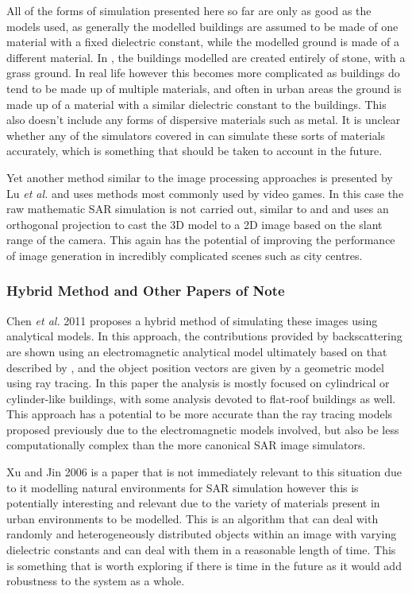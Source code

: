 All of the forms of simulation presented here so far are only as good as the models used, as generally the modelled buildings are assumed to be made of one material with a fixed dielectric constant, while the modelled ground is made of a different material. In \cite{hammerComparisonSARSimulation2008}, the buildings modelled are created entirely of stone, with a grass ground. In real life however this becomes more complicated as buildings do tend to be made up of multiple materials, and often in urban areas the ground is made up of a material with a similar dielectric constant to the buildings. This also doesn't include any forms of dispersive materials such as metal. It is unclear whether any of the simulators covered in \cite{hammerComparisonSARSimulation2008} can simulate these sorts of materials accurately, which is something that should be taken to account in the future. \par
Yet another method similar to the image processing approaches is presented by Lu \textit{et al.} \cite{luGPUBasedRealtime2009} and uses methods most commonly used by video games. In this case the raw mathematic SAR simulation is not carried out, similar to \cite{balzHybridGPUBasedSingle2009} and \cite{auerRayTracingSimulating2008} and uses an orthogonal projection to cast the 3D model to a 2D image based on the slant range of the camera. This again has the potential of improving the performance of image generation in incredibly complicated scenes such as city centres.
\par 
\subsubsection{Hybrid Method and Other Papers of Note}
Chen \textit{et al.} 2011 \cite{chenRadarImagingSimulation2011} proposes a hybrid method of simulating these images using analytical models. In this approach, the contributions provided by backscattering are shown using an electromagnetic analytical model ultimately based on that described by \cite{franceschettiSARRawSignal2003}, and the object position vectors are given by a geometric model using ray tracing. In this paper the analysis is mostly focused on cylindrical or cylinder-like buildings, with some analysis devoted to flat-roof buildings as well. This approach has a potential to be more accurate than the ray tracing models proposed previously due to the electromagnetic models involved, but also be less computationally complex than the more canonical SAR image simulators. 
\par
Xu and Jin 2006 \cite{xuImagingSimulationPolarimetric2006} is a paper that is not immediately relevant to this situation due to it modelling natural environments for SAR simulation however this is potentially interesting and relevant due to the variety of materials present in urban environments to be modelled. This is an algorithm that can deal with randomly and heterogeneously distributed objects within an image with varying dielectric constants and can deal with them in a reasonable length of time. This is something that is worth exploring if there is time in the future as it would add robustness to the system as a whole. 






